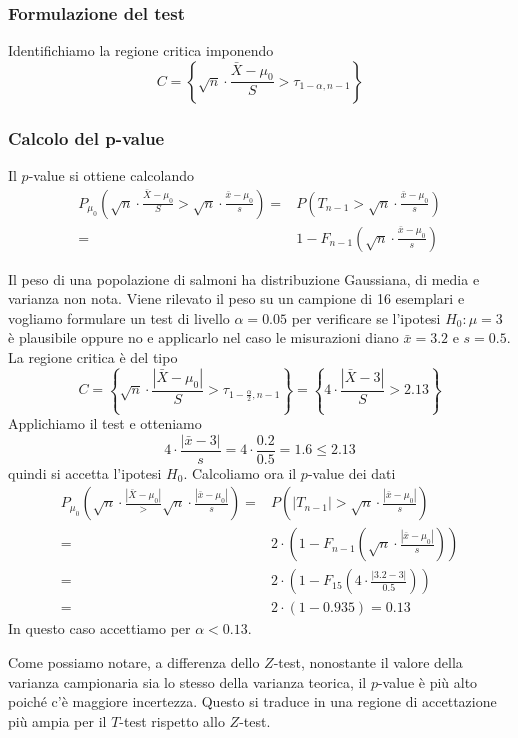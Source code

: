 \subsubsection{Formulazione del test}
Identifichiamo la regione critica imponendo
\[ C = \left\{ \sqrt{n} \cdot \frac{\bar{X} - \mu_0}{S} > \tau_{1 - \alpha, n-1} \right\} \]

\subsubsection{Calcolo del p-value}
Il $p$-value si ottiene calcolando
\begin{align*}
	P_{\mu_0} \left( \sqrt{n} \cdot \frac{\bar{X} - \mu_0}{S} >
	\sqrt{n} \cdot \frac{\bar{x} - \mu_0}{s} \right) = &
	P \left( T_{n-1} > \sqrt{n} \cdot \frac{\bar{x} - \mu_0}{s} \right) \\
	=                                                  &
	1 - F_{n-1} \left( \sqrt{n} \cdot \frac{\bar{x} - \mu_0}{s} \right)
\end{align*}

\begin{example}
	Il peso di una popolazione di salmoni ha distribuzione Gaussiana, di media e varianza non nota.
	Viene rilevato il peso su un campione di 16 esemplari e vogliamo formulare un test di livello
	$\alpha = 0.05$ per verificare se l'ipotesi $H_0 : \mu = 3$ è plausibile oppure no e applicarlo
	nel caso le misurazioni diano $\bar{x} = 3.2$ e $s = 0.5$. La regione critica è del tipo
	\[
		C = \left\{ \sqrt{n} \cdot \frac{|\bar{X} - \mu_0|}{S}
		> \tau_{1 - \frac{\alpha}{2}, n-1} \right\} =
		\left\{ 4 \cdot \frac{|\bar{X} - 3|}{S} > 2.13 \right\}
	\]
	Applichiamo il test e otteniamo
	\[ 4 \cdot \frac{|\bar{x} - 3|}{s} = 4 \cdot \frac{0.2}{0.5} = 1.6 \leq 2.13 \]
	quindi si accetta l'ipotesi $H_0$. Calcoliamo ora il $p$-value dei dati
	\begin{align*}
		P_{\mu_0} \left( \sqrt{n} \cdot \frac{|\bar{X} - \mu_0|} >
		\sqrt{n} \cdot \frac{|\bar{x} - \mu_0|}{s} \right) = &
		P \left( |T_{n-1}| > \sqrt{n} \cdot \frac{|\bar{x} - \mu_0|}{s} \right)                 \\
		=                                                    &
		2 \cdot \left( 1 - F_{n-1} \left( \sqrt{n} \cdot
		\frac{|\bar{x} - \mu_0|}{s} \right) \right)                                             \\
		=                                                    &
		2 \cdot \left( 1 - F_{15} \left( 4 \cdot \frac{|3.2 - 3|}{0.5} \right) \right)          \\
		=                                                    & 2 \cdot \left( 1 - 0.935 \right)
		= 0.13
	\end{align*}
	In questo caso accettiamo per $\alpha < 0.13$.
\end{example}

Come possiamo notare, a differenza dello $Z$-test, nonostante il valore della varianza campionaria
sia lo stesso della varianza teorica, il $p$-value è più alto poiché c'è maggiore incertezza.
Questo si traduce in una regione di accettazione più ampia per il $T$-test rispetto allo $Z$-test.